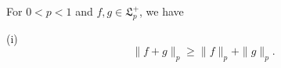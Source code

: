 For $0 < p < 1$ and $f, g \in \mathfrak{L}_p^+$, we have

(i) $$\|f + g\|_p \geq \|f\|_p + \|g\|_p.$$